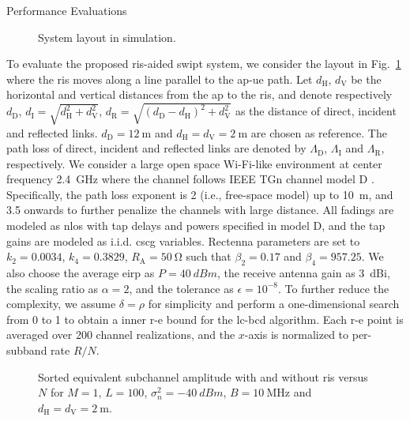 \begin{section}{Performance Evaluations}\label{se:performance_evaluation}
	\begin{figure}[!t]
		\centering
		\def\svgwidth{0.9\columnwidth}
		
		\caption{System layout in simulation.}
		\label{fi:layout}
	\end{figure}

	To evaluate the proposed \gls{ris}-aided \gls{swipt} system, we consider the layout in Fig.~\ref{fi:layout} where the \gls{ris} moves along a line parallel to the \gls{ap}-\gls{ue} path. Let $d_{\mathrm{H}}$, $d_{\mathrm{V}}$ be the horizontal and vertical distances from the \gls{ap} to the \gls{ris}, and denote respectively $d_{\mathrm{D}}$, $d_{\mathrm{I}}=\sqrt{d_{\mathrm{H}}^2+d_{\mathrm{V}}^2}$, $d_{\mathrm{R}}=\sqrt{(d_{\mathrm{D}}-d_{\mathrm{H}})^2+d_{\mathrm{V}}^2}$ as the distance of direct, incident and reflected links. $d_{\mathrm{D}}=\qty{12}{\meter}$ and $d_{\mathrm{H}}=d_{\mathrm{V}}=\qty{2}{\meter}$ are chosen as reference. The path loss of direct, incident and reflected links are denoted by $\Lambda_{\mathrm{D}}$, $\Lambda_{\mathrm{I}}$ and $\Lambda_{\mathrm{R}}$, respectively. We consider a large open space Wi-Fi-like environment at center frequency \qty{2.4}{\GHz} where the channel follows IEEE TGn channel model D \cite{Erceg2004}. Specifically, the path loss exponent is \num{2} (i.e., free-space model) up to \qty{10}{\meter}, and \num{3.5} onwards to further penalize the channels with large distance. All fadings are modeled as \gls{nlos} with tap delays and powers specified in model D, and the tap gains are modeled as i.i.d. \gls{cscg} variables. Rectenna parameters are set to $k_2=0.0034$, $k_4=0.3829$, $R_{\mathrm{A}}=\qty{50}{\ohm}$ \cite{Clerckx2016a} such that $\beta_2=0.17$ and $\beta_4=957.25$. We also choose the average \gls{eirp} as $P=\qty{40}{dBm}$, the receive antenna gain as \qty{3}{dBi}, the scaling ratio as $\alpha=2$, and the tolerance as $\epsilon=10^{-8}$. To further reduce the complexity, we assume $\delta=\rho$ for simplicity and perform a one-dimensional search from \num{0} to \num{1} to obtain a inner \gls{r-e} bound for the \gls{lc}-\gls{bcd} algorithm. Each \gls{r-e} point is averaged over \num{200} channel realizations, and the $x$-axis is normalized to per-subband rate $R/N$.

	\begin{figure}[!t]
		\centering
		\resizebox{0.8\columnwidth}{!}{
			
		}
		\caption{Sorted equivalent subchannel amplitude with and without \gls{ris} versus $N$ for $M=1$, $L=100$, $\sigma_n^2=\qty{-40}{dBm}$, $B=\qty{10}{\MHz}$ and $d_{\mathrm{H}}=d_{\mathrm{V}}=\qty{2}{\meter}$.}
		\label{fi:channel_amplitude}
	\end{figure}


\end{section}

